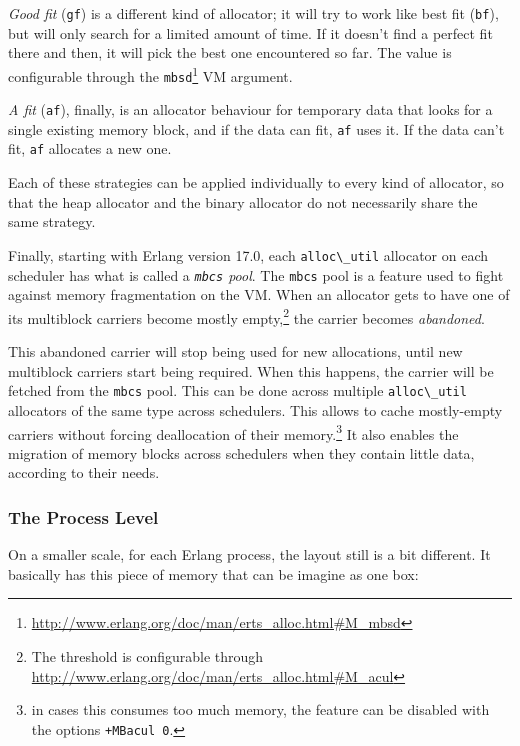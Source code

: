 \documentclass[11pt, oneside]{book}   	%
\newcommand{\term}[1]{\Verb`#1`}
\begin{document}
\emph{Good fit} (\term{gf}) is a different kind of allocator; it will try to work like best fit (\term{bf}), but will only search for a limited amount of time. If it doesn't find a perfect fit there and then, it will pick the best one encountered so far. The value is configurable through the \term{mbsd}\footnote{\href{http://www.erlang.org/doc/man/erts\_alloc.html\#M\_mbsd}{http://www.erlang.org/doc/man/erts\_alloc.html\#M\_mbsd}} VM argument.

\emph{A fit} (\term{af}), finally, is an allocator behaviour for temporary data that looks for a single existing memory block, and if the data can fit, \term{af} uses it. If the data can't fit, \term{af} allocates a new one.

Each of these strategies can be applied individually to every kind of allocator, so that the heap allocator and the binary allocator do not necessarily share the same strategy.

Finally, starting with Erlang version 17.0, each \term{alloc\_util} allocator on each scheduler has what is called a \emph{\term{mbcs} pool}. The \term{mbcs} pool is a feature used to fight against memory fragmentation on the VM. When an allocator gets to have one of its multiblock carriers become mostly empty,\footnote{The threshold is configurable through \href{http://www.erlang.org/doc/man/erts\_alloc.html\#M\_acul}{http://www.erlang.org/doc/man/erts\_alloc.html\#M\_acul}} the carrier becomes \emph{abandoned}. 

This abandoned carrier will stop being used for new allocations, until new multiblock carriers start being required. When this happens, the carrier will be fetched from the \term{mbcs} pool. This can be done across multiple \term{alloc\_util} allocators of the same type across schedulers. This allows to cache mostly-empty carriers without forcing deallocation of their memory.\footnote{in cases this consumes too much memory, the feature can be disabled with the options \term{+MBacul 0}.} It also enables the migration of memory blocks across schedulers when they contain little data, according to their needs.

\subsubsection{The Process Level}

On a smaller scale, for each Erlang process, the layout still is a bit different. It basically has this piece of memory that can be imagine as one box:
\end{document}

